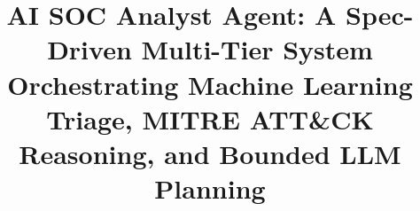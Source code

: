 \documentclass[conference]{IEEEtran}
\begin{document}
\title{AI SOC Analyst Agent: A Spec-Driven Multi-Tier System Orchestrating Machine Learning Triage, MITRE ATT\&CK Reasoning, and Bounded LLM Planning}



\maketitle












\end{document}
